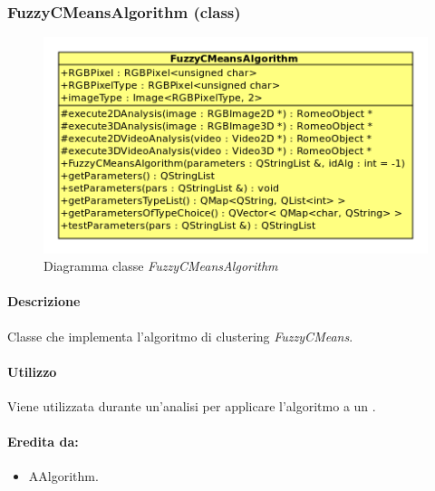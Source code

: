 \subsubsection{FuzzyCMeansAlgorithm (class)}
\label{fuzzyCMeansAlgorithm}
\begin{figure}[!h]
\centering
			\includegraphics[scale=1]{./Content/Immagini/modelCore/FuzzyCMeansAlgorithm.png}
			\caption{Diagramma classe \textsl{FuzzyCMeansAlgorithm}}
			\label{fuzzyCMeansAlgorithm_img}
\end{figure}

\paragraph{Descrizione \\} Classe che implementa l'algoritmo di clustering\g{} \textit{FuzzyCMeans}.

\paragraph{Utilizzo\\} Viene utilizzata durante un'analisi per applicare l'algoritmo a un \dataset{}.

\paragraph{Eredita da:}
\begin{itemize}
	\item AAlgorithm.
\end{itemize}


	
